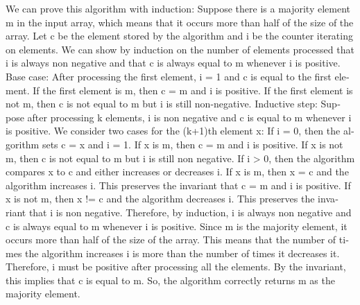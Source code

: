 \documentclass[12pt]{article}
\begin{document}
\begin{latin}
\newline We can prove this algorithm with induction:\newline
\newline Suppose there is a majority element m in the input array, which means that it occurs more than half of the size of the array.
\newline Let c be the element stored by the algorithm and i be the counter iterating on elements.
We can show by induction on the number of elements processed that i is always non negative and that c is always equal to m whenever i is positive.
\newline Base case: After processing the first element, i = 1 and c is equal to the first element. If the first element is m, then c = m and i is positive. If the first element is not m, then c is not equal to m but i is still non-negative.
\newline Inductive step: Suppose after processing k elements, i is non negative and c is equal to m whenever i is positive. We consider two cases for the (k+1)th element x:
If i = 0, then the algorithm sets c = x and i = 1. If x is m, then c = m and i is positive. If x is not m, then c is not equal to m but i is still non negative.
If i > 0, then the algorithm compares x to c and either increases or decreases i. If x is m, then x = c and the algorithm increases i. This preserves the invariant that c = m and i is positive. If x is not m, then x != c and the algorithm decreases i. This preserves the invariant that i is non negative.
Therefore, by induction, i is always non negative and c is always equal to m whenever i is positive.
\newline Since m is the majority element, it occurs more than half of the size of the array. This means that the number of times the algorithm increases i is more than the number of times it decreases it. Therefore, i must be positive after processing all the elements. By the invariant, this implies that c is equal to m.
\newline So, the algorithm correctly returns m as the majority element.

\end{latin}
\end{document}
